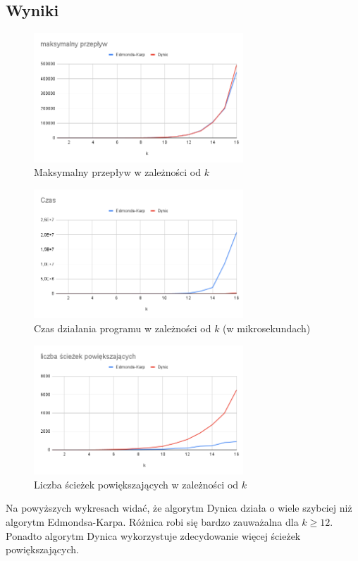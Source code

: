 \documentclass{article}
\begin{document}
\subsection*{Wyniki}
\begin{figure}[H]
    \centering
    \includegraphics[width=0.7\textwidth]{dynic/przep.png}
    \caption{Maksymalny przepływ w zależności od $k$}
\end{figure}
\begin{figure}[H]
    \centering
    \includegraphics[width=0.7\textwidth]{dynic/czas.png}
    \caption{Czas działania programu w zależności od $k$ (w mikrosekundach)}
\end{figure}
\begin{figure}[H]
    \centering
    \includegraphics[width=0.7\textwidth]{dynic/sciez.png}
    \caption{Liczba ścieżek powiększających w zależności od $k$}
\end{figure}
Na powyższych wykresach widać, że algorytm Dynica działa o wiele szybciej niż algorytm Edmondsa-Karpa. Różnica robi się bardzo zauważalna dla $k \geq 12$. Ponadto algorytm Dynica wykorzystuje zdecydowanie więcej ścieżek powiększających.
\end{document}
